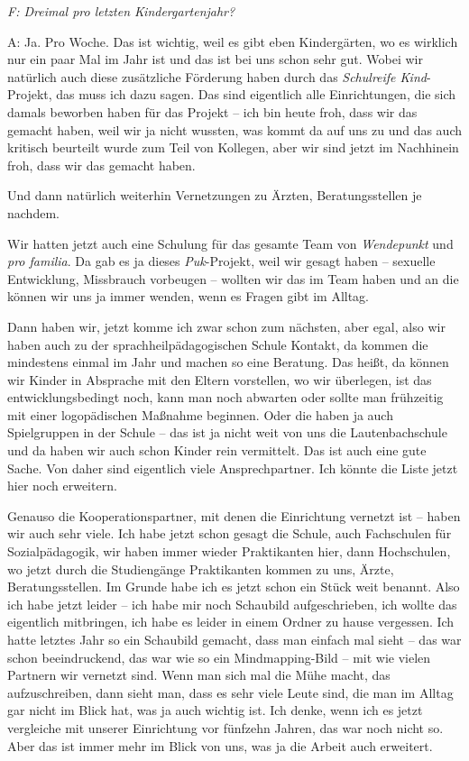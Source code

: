 \begin{linenumbers*}
\emph{F: Dreimal pro letzten Kindergartenjahr?}

A: Ja. Pro Woche. Das ist wichtig, weil es gibt eben Kindergärten, wo es wirklich nur ein paar Mal im Jahr ist und das ist bei uns schon sehr gut. Wobei wir natürlich auch diese zusätzliche Förderung haben durch das \emph{Schulreife Kind}-Projekt, das muss ich dazu sagen. Das sind eigentlich alle Einrichtungen, die sich damals beworben haben für das Projekt -- ich bin heute froh, dass wir das gemacht haben, weil wir ja nicht wussten, was kommt da auf uns zu und das auch kritisch beurteilt wurde zum Teil von Kollegen, aber wir sind jetzt im Nachhinein froh, dass wir das gemacht haben. 

Und dann natürlich weiterhin Vernetzungen zu Ärzten, Beratungsstellen je nachdem. 

Wir hatten jetzt auch eine Schulung für das gesamte Team von \emph{Wendepunkt} und \emph{pro familia}. Da gab es ja dieses \emph{Puk}-Projekt, weil wir gesagt haben -- sexuelle Entwicklung, Missbrauch vorbeugen -- wollten wir das im Team haben und an die können wir uns ja immer wenden, wenn es Fragen gibt im Alltag. 

Dann haben wir, jetzt komme ich zwar schon zum nächsten, aber egal, also wir haben auch zu der sprachheilpädagogischen Schule Kontakt, da kommen die mindestens einmal im Jahr und machen so eine Beratung. Das heißt, da können wir Kinder in Absprache mit den Eltern vorstellen, wo wir überlegen, ist das entwicklungsbedingt noch, kann man noch abwarten oder sollte man frühzeitig mit einer logopädischen Maßnahme beginnen. Oder die haben ja auch Spielgruppen in der Schule -- das ist ja nicht weit von uns die Lautenbachschule und da haben wir auch schon Kinder rein vermittelt. Das ist auch eine gute Sache. Von daher sind eigentlich viele Ansprechpartner. Ich könnte die Liste jetzt hier noch erweitern. 

Genauso die Kooperationspartner, mit denen die Einrichtung vernetzt ist -- haben wir auch sehr viele. Ich habe jetzt schon gesagt die Schule, auch Fachschulen für Sozialpädagogik, wir haben immer wieder Praktikanten hier, dann Hochschulen, wo jetzt durch die Studiengänge Praktikanten kommen zu uns, Ärzte, Beratungsstellen. Im Grunde habe ich es jetzt schon ein Stück weit benannt.
Also ich habe jetzt leider -- ich habe mir noch Schaubild aufgeschrieben, ich wollte das eigentlich mitbringen, ich habe es leider in einem Ordner zu hause vergessen. Ich hatte letztes Jahr so ein Schaubild gemacht, dass man einfach mal sieht -- das war schon beeindruckend, das war wie so ein Mindmapping-Bild -- mit wie vielen Partnern wir vernetzt sind. Wenn man sich mal die Mühe macht, das aufzuschreiben, dann sieht man, dass es sehr viele Leute sind, die man im Alltag gar nicht im Blick hat, was ja auch wichtig ist. Ich denke, wenn ich es jetzt vergleiche mit unserer Einrichtung vor fünfzehn Jahren, das war noch nicht so. Aber das ist immer mehr im Blick von uns, was ja die Arbeit auch erweitert. 


\end{linenumbers*}
